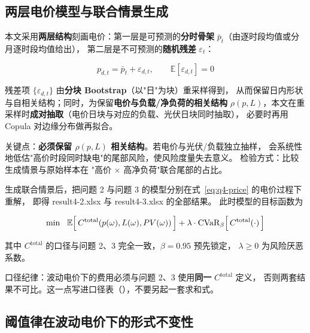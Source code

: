\subsection{两层电价模型与联合情景生成}

本文采用\textbf{两层结构}刻画电价：第一层是可预测的\textbf{分时骨架}
\(\bar p_t\)（由逐时段均值或分月逐时段均值给出），
第二层是不可预测的\textbf{随机残差} \(\varepsilon_t\)：

\begin{equation}
  p_{d,t}=\bar p_{t}+\varepsilon_{d,t},\qquad
  \mathbb{E}[\varepsilon_{d,t}]=0
  \label{eq:q4-price}
\end{equation}

残差项 \(\{\varepsilon_{d,t}\}\) 由\textbf{分块 Bootstrap}（以"日"为块）重采样得到，
从而保留日内形状与自相关结构；同时，为保留\textbf{电价与负载/净负荷的相关结构}
\(\rho(p,L)\)，本文在重采样时\textbf{成对抽取}（电价日块与对应的负载、光伏日块同时抽取），
必要时再用 Copula 对边缘分布做再拟合。
\begin{guideblock}
关键点：\textbf{必须保留 \(\rho(p,L)\) 相关结构}。若电价与光伏/负载独立抽样，
会系统性地低估"高价时段同时缺电"的尾部风险，使风险度量失去意义。
检验方式：比较生成情景与原始样本在
"高价 \(\times\) 高净负荷"联合尾部的占比。
\end{guideblock}

生成联合情景后，把问题 2 与问题 3 的模型分别在式~\eqref{eq:q4-price} 的电价过程下重解，
即得 result4-2.xlsx 与 result4-3.xlsx 的全部结果。
此时模型的目标函数为

\begin{equation}
  \min\ \ \mathbb{E}\Bigl[\,C^{\text{total}}(p(\omega),L(\omega),PV(\omega))\,\Bigr]
  +\lambda\cdot \mathrm{CVaR}_\beta\Bigl[\,C^{\text{total}}(\cdot)\,\Bigr]
  \label{eq:q4-obj}
\end{equation}

其中 \(C^{\text{total}}\) 的口径与问题 2、3 完全一致，\(\beta=0.95\) 预先锁定，
\(\lambda\ge 0\) 为风险厌恶系数。

\begin{guideblock}
口径纪律：波动电价下的费用必须与问题 2、3 使用\textbf{同一} \(C^{\text{total}}\) 定义，
否则两套结果不可比。这一点写进口径表（），不要另起一套求和式。
\end{guideblock}

\subsection{阈值律在波动电价下的形式不变性}

